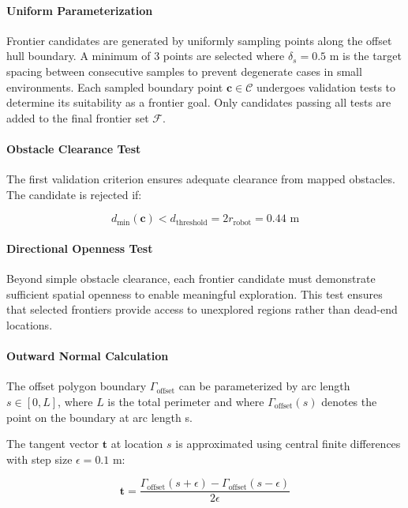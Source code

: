 \documentclass[11pt]{article}
\begin{document}
\paragraph{Uniform Parameterization}

Frontier candidates are generated by uniformly sampling points along the offset hull boundary. A minimum of 3 points are selected where $\delta_s = 0.5$ m is the target spacing between consecutive samples to prevent degenerate cases in small environments. Each sampled boundary point $\mathbf{c} \in \mathcal{C}$ undergoes validation tests to determine its suitability as a frontier goal. Only candidates passing all tests are added to the final frontier set $\mathcal{F}$.

\paragraph{Obstacle Clearance Test}
The first validation criterion ensures adequate clearance from mapped obstacles. The candidate is rejected if:

\begin{equation}
	d_{\min}(\mathbf{c}) < d_{\text{threshold}} = 2 r_{\text{robot}} = 0.44 \text{ m}
\end{equation}

\paragraph{Directional Openness Test}

Beyond simple obstacle clearance, each frontier candidate must demonstrate sufficient spatial openness to enable meaningful exploration. This test ensures that selected frontiers provide access to unexplored regions rather than dead-end locations.

\paragraph{Outward Normal Calculation}

The offset polygon boundary $\Gamma_{\text{offset}}$ can be parameterized by arc length $s \in [0, L]$, where $L$ is the total perimeter and  where $\Gamma_{\text{offset}}(s)$ denotes the point on the boundary at arc length s.


The tangent vector $\mathbf{t}$ at location $s$ is approximated using central finite differences with step size $\epsilon = 0.1$ m:

\begin{equation}
	\mathbf{t} = \frac{\Gamma_{\text{offset}}(s + \epsilon) - \Gamma_{\text{offset}}(s - \epsilon)}{2\epsilon}
\end{equation}
\end{document}
